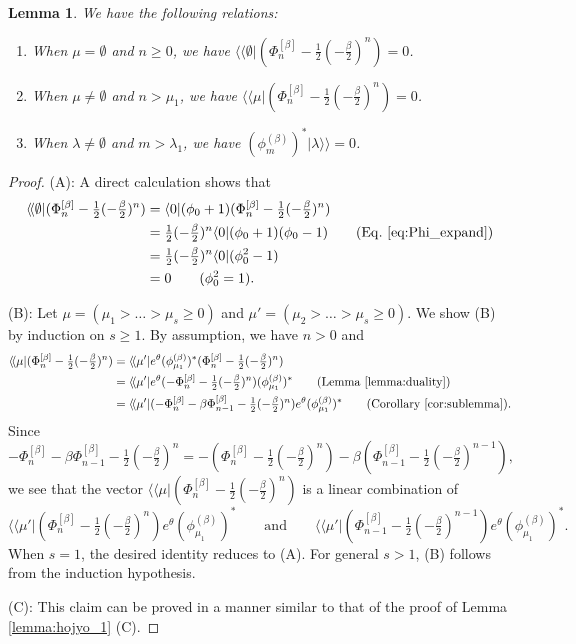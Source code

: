 \documentclass{amsart}
\newtheorem{lemma}[thm]{Lemma}
\def\bra#1{\langle #1 \vert}
\def\kket#1{\vert #1 \rangle\!\rangle}
\def\bbra#1{\langle\!\langle #1 \vert}
\begin{document}
\begin{lemma}\label{lemma:hojyo2}
We have the following relations:
\begin{enumerate}
\item[(A).] When $\mu=\emptyset$ and $n\geq 0$, we have $\bbra{\emptyset}(\Phi^{[\beta]}_n-\tfrac{1}{2}(-\tfrac{\beta}{2})^{n})=0$.
\item[(B).] When $\mu\neq \emptyset$ and $n> \mu_1$, we have $\bbra{\mu}(\Phi^{[\beta]}_n-\tfrac{1}{2}(-\tfrac{\beta}{2})^{n})=0$.
\item[(C).] When $\lambda\neq \emptyset$ and $m>\lambda_1$, we have $(\phi^{(\beta)}_m)^\ast \kket{\lambda}=0$.
\end{enumerate}
\end{lemma}

\begin{proof}
(A):
A direct calculation shows that
\[
\begin{aligned}
\bbra{\emptyset}(\Phi^{[\beta]}_n-\tfrac{1}{2}(-\tfrac{\beta}{2})^{n})
&=
\bra{0}(\phi_0+1)(\Phi_n^{[\beta]}-\tfrac{1}{2}(-\tfrac{\beta}{2})^n)\\
&=
\tfrac{1}{2}(-\tfrac{\beta}{2})^n
\bra{0}(\phi_0+1)(\phi_0-1)\qquad (\mathrm{Eq.~\eqref{eq:Phi_expand}})\\
&=
\tfrac{1}{2}(-\tfrac{\beta}{2})^n
\bra{0}(\phi_0^2-1)\\
&=0 \qquad (\phi_0^2=1).
\end{aligned}
\]

(B):
Let $\mu=(\mu_1>\dots>\mu_s\geq 0)$ and $\mu'=(\mu_2>\dots>\mu_s\geq 0)$.
We show (B) by induction on $s\geq 1$. By assumption, we have $n>0$ and
\begin{align*}
\bbra{\mu}(\Phi^{[\beta]}_n-\tfrac{1}{2}(-\tfrac{\beta}{2})^{n})
&=
\bbra{\mu'}e^{\theta}(\phi^{(\beta)}_{\mu_1})^\ast(\Phi^{[\beta]}_n-\tfrac{1}{2}(-\tfrac{\beta}{2})^{n})\\
&=
\bbra{\mu'}e^{\theta}(-\Phi^{[\beta]}_n-\tfrac{1}{2}(-\tfrac{\beta}{2})^{n})(\phi^{(\beta)}_{\mu_1})^\ast\qquad (\text{Lemma~\ref{lemma:duality}})\\
&=
\bbra{\mu'}(-\Phi^{[\beta]}_n-\beta\Phi^{[\beta]}_{n-1} -\tfrac{1}{2}(-\tfrac{\beta}{2})^{n})e^{\theta}(\phi^{(\beta)}_{\mu_1})^\ast \qquad (\text{Corollary~\ref{cor:sublemma}}).
\end{align*}
Since
\[
-\Phi^{[\beta]}_n-\beta\Phi^{[\beta]}_{n-1} -\tfrac{1}{2}(-\tfrac{\beta}{2})^{n}=
-(\Phi^{[\beta]}_n-\tfrac{1}{2}(-\tfrac{\beta}{2})^n)
-\beta (\Phi^{[\beta]}_{n-1}-\tfrac{1}{2}(-\tfrac{\beta}{2})^{n-1})
,
\]
we see that the vector 
$
\bbra{\mu}(\Phi^{[\beta]}_n-\tfrac{1}{2}(-\tfrac{\beta}{2})^{n})
$
is a linear combination of 
\[
\bbra{\mu'}(\Phi^{[\beta]}_n-\tfrac{1}{2}(-\tfrac{\beta}{2})^{n})e^{\theta}(\phi^{(\beta)}_{\mu_1})^\ast
\qquad \text{and}\qquad  
\bbra{\mu'}(\Phi^{[\beta]}_{n-1}-\tfrac{1}{2}(-\tfrac{\beta}{2})^{n-1})e^{\theta}(\phi^{(\beta)}_{\mu_1})^\ast.
\]
When $s=1$, the desired identity reduces to (A).
For general $s>1$, (B) follows from the induction hypothesis.

(C):
This claim can be proved in a manner similar to that of the proof of Lemma \ref{lemma:hojyo_1} (C).
\end{proof}
\end{document}
